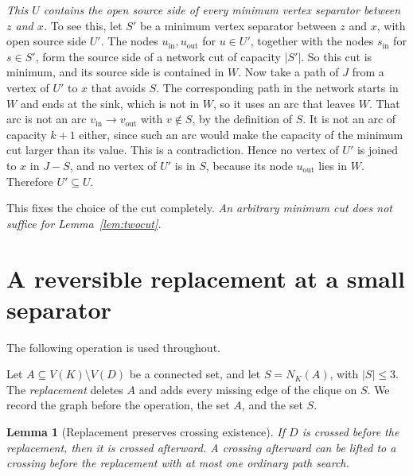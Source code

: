 \documentclass[11pt]{article}
\newtheorem{lemma}{Lemma}
\newcommand{\vin}[1]{#1_{\mathrm{in}}}
\newcommand{\vout}[1]{#1_{\mathrm{out}}}
\begin{document}
\emph{This $U$ contains the open source side of every minimum vertex separator
between $z$ and $x$.} To see this, let $S'$ be a minimum vertex separator
between $z$ and $x$, with open source side $U'$. The nodes $\vin u,\vout u$ for
$u\in U'$, together with the nodes $\vin s$ for $s\in S'$, form the source side
of a network cut of capacity $|S'|$. So this cut is minimum, and its source
side is contained in $W$. Now take a path of $J$ from a vertex of $U'$ to $x$
that avoids $S$. The corresponding path in the network starts in $W$ and ends
at the sink, which is not in $W$, so it uses an arc that leaves $W$. That arc is
not an arc $\vin v\to\vout v$ with $v\notin S$, by the definition of $S$. It is
not an arc of capacity $k+1$ either, since such an arc would make the capacity
of the minimum cut larger than its value. This is a contradiction. Hence no
vertex of $U'$ is joined to $x$ in $J-S$, and no vertex of $U'$ is in $S$,
because its node $\vout u$ lies in $W$. Therefore $U'\subseteq U$.

This fixes the choice of the cut completely. \emph{An arbitrary minimum cut
does not suffice for Lemma~\ref{lem:twocut}.}

\section{A reversible replacement at a small separator}\label{sec:replace}

The following operation is used throughout.

Let $A\subseteq V(K)\setminus V(D)$ be a connected set, and let $S=N_K(A)$,
with $|S|\le 3$. The \emph{replacement} deletes $A$ and adds every missing edge
of the clique on $S$. We record the graph before the operation, the set $A$,
and the set $S$.

\begin{lemma}[Replacement preserves crossing existence]\label{lem:replace}
If $D$ is crossed before the replacement, then it is crossed afterward. A
crossing afterward can be lifted to a crossing before the replacement with at
most one ordinary path search.
\end{lemma}
\end{document}
